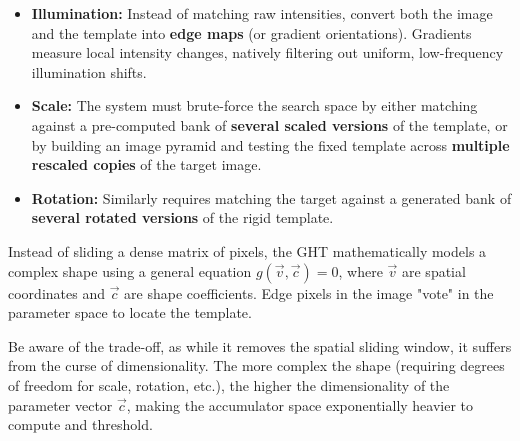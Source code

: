 {
\begin{itemize}
    \item \textbf{Illumination:} Instead of matching raw intensities, convert both the image and the template into \textbf{edge maps} (or gradient orientations). Gradients measure local intensity changes, natively filtering out uniform, low-frequency illumination shifts.
    \item \textbf{Scale:} The system must brute-force the search space by either matching against a pre-computed bank of \textbf{several scaled versions} of the template, or by building an image pyramid and testing the fixed template across \textbf{multiple rescaled copies} of the target image.
    \item \textbf{Rotation:} Similarly requires matching the target against a generated bank of \textbf{several rotated versions} of the rigid template.
\end{itemize}}

{
Instead of sliding a dense matrix of pixels, the GHT mathematically models a complex shape using a general equation $g(\vec{v}, \vec{c}) = 0$, where $\vec{v}$ are spatial coordinates and $\vec{c}$ are shape coefficients. Edge pixels in the image "vote" in the parameter space to locate the template.

Be aware of the trade-off, as while it removes the spatial sliding window, it suffers from the curse of dimensionality. The more complex the shape (requiring degrees of freedom for scale, rotation, etc.), the higher the dimensionality of the parameter vector $\vec{c}$, making the accumulator space exponentially heavier to compute and threshold.
}

